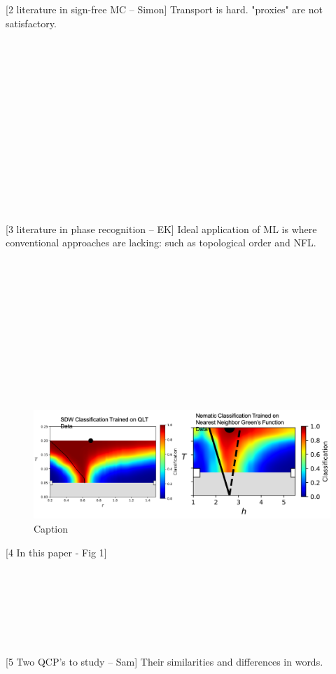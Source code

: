 \documentclass[amsmath,amssymb, aps, prx, longbibliography, twocolumn]{revtex4-1}
\begin{document}
[2 literature in sign-free MC -- Simon]
Transport is hard. "proxies" are not satisfactory.
\\
\\
\\
\\
\\
\\
\\
\\
\\
\\
\\
\\
\\
\\
\\

[3 literature in phase recognition -- EK]
Ideal application of ML is where conventional approaches are lacking: such as topological order and NFL.
 \\
 \\
 \\
 \\
 \\
 \\
 \\
 \\
 \\
 \\
 \\
 \\
 \begin{figure} [t]
    \centering
\includegraphics[width=.5\textwidth]{3PT-PDs.png}
    \caption{Caption}
    \label{fig:pds}
\end{figure}
[4 In this paper - Fig 1] 
\\
\\
\\
\\
\\
\\
\\
\\


[5 Two QCP's to study -- Sam]
Their similarities and differences in words.
\\
\\
\\
\\
\\
\\
\\
\\
\\
\end{document}
